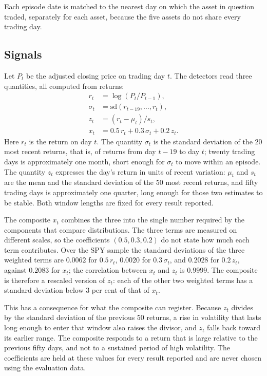 \documentclass[pdflatex,sn-mathphys-num,iicol]{sn-jnl}
\begin{document}
Each episode date is matched to the nearest day on which the asset in question traded, separately for each asset, because the five assets do not share every trading day.

\subsection{Signals}
Let $P_t$ be the adjusted closing price on trading day $t$. The detectors read three quantities, all computed from returns:
\begin{align}
r_t &= \log(P_t/P_{t-1}),\\
\sigma_t &= \mathrm{sd}(r_{t-19},\dots,r_t),\\
z_t &= (r_t-\mu_t)/s_t,\\
x_t &= 0.5\,r_t + 0.3\,\sigma_t + 0.2\,z_t.
\end{align}
Here $r_t$ is the return on day $t$. The quantity $\sigma_t$ is the standard deviation of the 20 most recent returns, that is, of returns from day $t-19$ to day $t$; twenty trading days is approximately one month, short enough for $\sigma_t$ to move within an episode. The quantity $z_t$ expresses the day's return in units of recent variation: $\mu_t$ and $s_t$ are the mean and the standard deviation of the 50 most recent returns, and fifty trading days is approximately one quarter, long enough for those two estimates to be stable. Both window lengths are fixed for every result reported.

The composite $x_t$ combines the three into the single number required by the components that compare distributions. The three terms are measured on different scales, so the coefficients $(0.5, 0.3, 0.2)$ do not state how much each term contributes. Over the SPY sample the standard deviations of the three weighted terms are $0.0062$ for $0.5\,r_t$, $0.0020$ for $0.3\,\sigma_t$, and $0.2028$ for $0.2\,z_t$, against $0.2083$ for $x_t$; the correlation between $x_t$ and $z_t$ is $0.9999$. The composite is therefore a rescaled version of $z_t$: each of the other two weighted terms has a standard deviation below 3 per cent of that of $x_t$.

This has a consequence for what the composite can register. Because $z_t$ divides by the standard deviation of the previous 50 returns, a rise in volatility that lasts long enough to enter that window also raises the divisor, and $z_t$ falls back toward its earlier range. The composite responds to a return that is large relative to the previous fifty days, and not to a sustained period of high volatility. The coefficients are held at these values for every result reported and are never chosen using the evaluation data.
\end{document}
